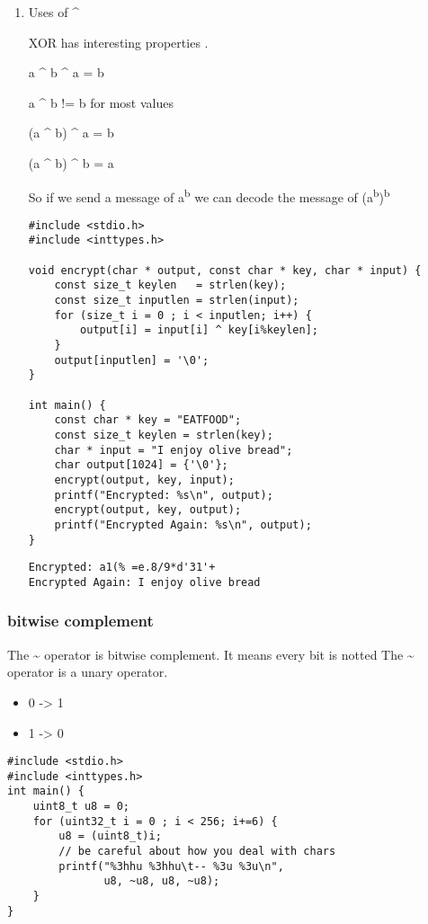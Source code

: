 \documentclass[11pt]{article}
\begin{document}
\begin{enumerate}
\item Uses of \^{}
\label{sec:org373d2dd}

XOR has interesting properties .

a \^{} b \^{} a = b

a \^{} b != b for most values

(a \^{} b) \^{} a = b

(a \^{} b) \^{} b = a

So if we send a message of a\textsuperscript{b} we can decode the message of (a\textsuperscript{b})\textsuperscript{b}

\begin{verbatim}
#include <stdio.h>
#include <inttypes.h>

void encrypt(char * output, const char * key, char * input) {
    const size_t keylen   = strlen(key);
    const size_t inputlen = strlen(input);
    for (size_t i = 0 ; i < inputlen; i++) {
        output[i] = input[i] ^ key[i%keylen];
    }
    output[inputlen] = '\0';   
}

int main() {  
    const char * key = "EATFOOD";
    const size_t keylen = strlen(key);
    char * input = "I enjoy olive bread";
    char output[1024] = {'\0'};
    encrypt(output, key, input);
    printf("Encrypted: %s\n", output);
    encrypt(output, key, output);
    printf("Encrypted Again: %s\n", output);
}
\end{verbatim}

\begin{verbatim}
Encrypted: a1(% =e.8/9*d'31'+
Encrypted Again: I enjoy olive bread
\end{verbatim}
\end{enumerate}

\subsubsection{bitwise complement}
\label{sec:org39b1384}

The \textasciitilde{} operator is bitwise complement. It means every bit is notted
The \textasciitilde{} operator is a unary operator.

\begin{itemize}
\item 0 -> 1
\item 1 -> 0
\end{itemize}

\begin{verbatim}
#include <stdio.h>
#include <inttypes.h>
int main() {
    uint8_t u8 = 0;
    for (uint32_t i = 0 ; i < 256; i+=6) {
        u8 = (uint8_t)i;
        // be careful about how you deal with chars
        printf("%3hhu %3hhu\t-- %3u %3u\n",
               u8, ~u8, u8, ~u8);
    }
}
\end{verbatim}
\end{document}
